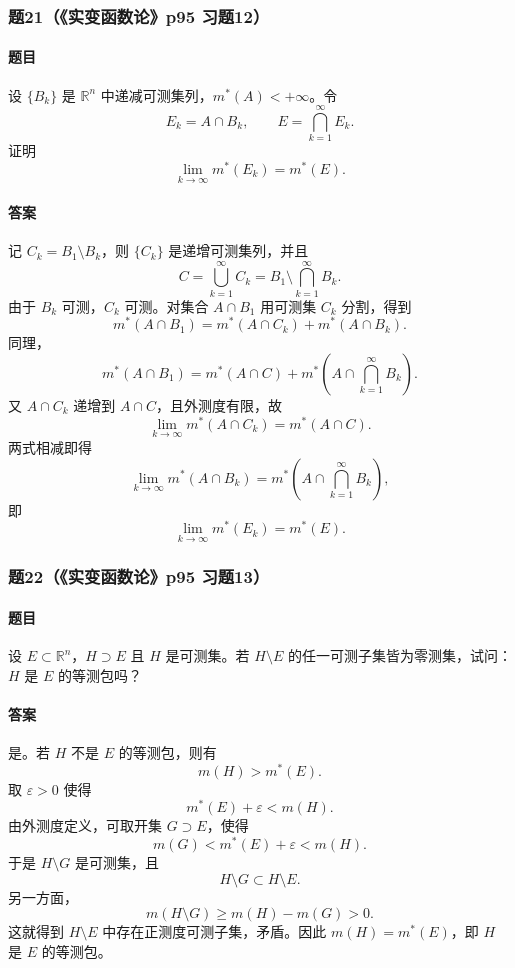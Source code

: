 \documentclass{article}
\newcommand{\R}{\mathbb{R}}
\newcommand{\eps}{\varepsilon}
\newcommand{\meas}{m}
\newcommand{\mouter}{m^*}
\begin{document}
	\subsubsection*{题21（《实变函数论》p95 习题12）}
	\paragraph{题目}设 $\{B_k\}$ 是 $\R^n$ 中递减可测集列，$\mouter(A)<+\infty$。令
	\[
	E_k=A\cap B_k,
	\qquad
	E=\bigcap_{k=1}^{\infty}E_k.
	\]
	证明
	\[
	\lim_{k\to\infty}\mouter(E_k)=\mouter(E).
	\]
	
	\paragraph{答案}记 $C_k=B_1\setminus B_k$，则 $\{C_k\}$ 是递增可测集列，并且
	\[
	C=\bigcup_{k=1}^{\infty}C_k=B_1\setminus\bigcap_{k=1}^{\infty}B_k.
	\]
	由于 $B_k$ 可测，$C_k$ 可测。对集合 $A\cap B_1$ 用可测集 $C_k$ 分割，得到
	\[
	\mouter(A\cap B_1)=\mouter(A\cap C_k)+\mouter(A\cap B_k).
	\]
	同理，
	\[
	\mouter(A\cap B_1)=\mouter(A\cap C)+\mouter\left(A\cap\bigcap_{k=1}^{\infty}B_k\right).
	\]
	又 $A\cap C_k$ 递增到 $A\cap C$，且外测度有限，故
	\[
	\lim_{k\to\infty}\mouter(A\cap C_k)=\mouter(A\cap C).
	\]
	两式相减即得
	\[
	\lim_{k\to\infty}\mouter(A\cap B_k)
	=
	\mouter\left(A\cap\bigcap_{k=1}^{\infty}B_k\right),
	\]
	即
	\[
	\lim_{k\to\infty}\mouter(E_k)=\mouter(E).
	\]
	
	\subsubsection*{题22（《实变函数论》p95 习题13）}
	\paragraph{题目}设 $E\subset\R^n$，$H\supset E$ 且 $H$ 是可测集。若 $H\setminus E$ 的任一可测子集皆为零测集，试问：$H$ 是 $E$ 的等测包吗？
	
	\paragraph{答案}是。若 $H$ 不是 $E$ 的等测包，则有
	\[
	\meas(H)>\mouter(E).
	\]
	取 $\eps>0$ 使得
	\[
	\mouter(E)+\eps<\meas(H).
	\]
	由外测度定义，可取开集 $G\supset E$，使得
	\[
	\meas(G)<\mouter(E)+\eps<\meas(H).
	\]
	于是 $H\setminus G$ 是可测集，且
	\[
	H\setminus G\subset H\setminus E.
	\]
	另一方面，
	\[
	\meas(H\setminus G)
	\ge \meas(H)-\meas(G)>0.
	\]
	这就得到 $H\setminus E$ 中存在正测度可测子集，矛盾。因此 $\meas(H)=\mouter(E)$，即 $H$ 是 $E$ 的等测包。
	
\end{document}
